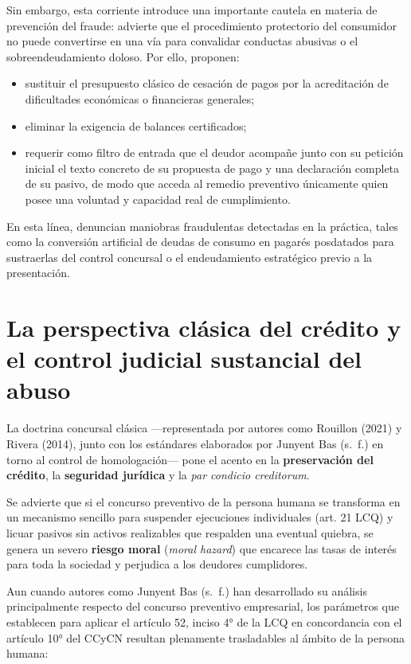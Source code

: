 \documentclass[12pt,oneside]{book}
\begin{document}
Sin embargo, esta corriente introduce una importante cautela en materia de prevención del fraude: advierte que el procedimiento protectorio del consumidor no puede convertirse en una vía para convalidar conductas abusivas o el sobreendeudamiento doloso. Por ello, proponen:

\begin{itemize}
    \item sustituir el presupuesto clásico de cesación de pagos por la acreditación de dificultades económicas o financieras generales;
    \item eliminar la exigencia de balances certificados;
    \item requerir como filtro de entrada que el deudor acompañe junto con su petición inicial el texto concreto de su propuesta de pago y una declaración completa de su pasivo, de modo que acceda al remedio preventivo únicamente quien posee una voluntad y capacidad real de cumplimiento.
\end{itemize}

En esta línea, denuncian maniobras fraudulentas detectadas en la práctica, tales como la conversión artificial de deudas de consumo en pagarés posdatados para sustraerlas del control concursal o el endeudamiento estratégico previo a la presentación.

\section{La perspectiva clásica del crédito y el control judicial sustancial del abuso}

La doctrina concursal clásica ---representada por autores como Rouillon (2021) y Rivera (2014), junto con los estándares elaborados por Junyent Bas (s.~f.) en torno al control de homologación--- pone el acento en la \textbf{preservación del crédito}, la \textbf{seguridad jurídica} y la \textit{par condicio creditorum}.

Se advierte que si el concurso preventivo de la persona humana se transforma en un mecanismo sencillo para suspender ejecuciones individuales (art. 21 LCQ) y licuar pasivos sin activos realizables que respalden una eventual quiebra, se genera un severo \textbf{riesgo moral} (\textit{moral hazard}) que encarece las tasas de interés para toda la sociedad y perjudica a los deudores cumplidores.

Aun cuando autores como Junyent Bas (s.~f.) han desarrollado su análisis principalmente respecto del concurso preventivo empresarial, los parámetros que establecen para aplicar el artículo 52, inciso 4° de la LCQ en concordancia con el artículo 10° del CCyCN resultan plenamente trasladables al ámbito de la persona humana:
\end{document}
